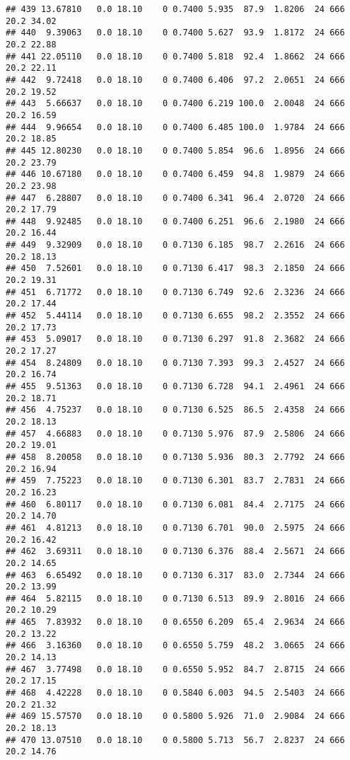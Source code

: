 \documentclass[
]{article}
\begin{document}
\begin{verbatim}
## 439 13.67810   0.0 18.10    0 0.7400 5.935  87.9  1.8206  24 666    20.2 34.02
## 440  9.39063   0.0 18.10    0 0.7400 5.627  93.9  1.8172  24 666    20.2 22.88
## 441 22.05110   0.0 18.10    0 0.7400 5.818  92.4  1.8662  24 666    20.2 22.11
## 442  9.72418   0.0 18.10    0 0.7400 6.406  97.2  2.0651  24 666    20.2 19.52
## 443  5.66637   0.0 18.10    0 0.7400 6.219 100.0  2.0048  24 666    20.2 16.59
## 444  9.96654   0.0 18.10    0 0.7400 6.485 100.0  1.9784  24 666    20.2 18.85
## 445 12.80230   0.0 18.10    0 0.7400 5.854  96.6  1.8956  24 666    20.2 23.79
## 446 10.67180   0.0 18.10    0 0.7400 6.459  94.8  1.9879  24 666    20.2 23.98
## 447  6.28807   0.0 18.10    0 0.7400 6.341  96.4  2.0720  24 666    20.2 17.79
## 448  9.92485   0.0 18.10    0 0.7400 6.251  96.6  2.1980  24 666    20.2 16.44
## 449  9.32909   0.0 18.10    0 0.7130 6.185  98.7  2.2616  24 666    20.2 18.13
## 450  7.52601   0.0 18.10    0 0.7130 6.417  98.3  2.1850  24 666    20.2 19.31
## 451  6.71772   0.0 18.10    0 0.7130 6.749  92.6  2.3236  24 666    20.2 17.44
## 452  5.44114   0.0 18.10    0 0.7130 6.655  98.2  2.3552  24 666    20.2 17.73
## 453  5.09017   0.0 18.10    0 0.7130 6.297  91.8  2.3682  24 666    20.2 17.27
## 454  8.24809   0.0 18.10    0 0.7130 7.393  99.3  2.4527  24 666    20.2 16.74
## 455  9.51363   0.0 18.10    0 0.7130 6.728  94.1  2.4961  24 666    20.2 18.71
## 456  4.75237   0.0 18.10    0 0.7130 6.525  86.5  2.4358  24 666    20.2 18.13
## 457  4.66883   0.0 18.10    0 0.7130 5.976  87.9  2.5806  24 666    20.2 19.01
## 458  8.20058   0.0 18.10    0 0.7130 5.936  80.3  2.7792  24 666    20.2 16.94
## 459  7.75223   0.0 18.10    0 0.7130 6.301  83.7  2.7831  24 666    20.2 16.23
## 460  6.80117   0.0 18.10    0 0.7130 6.081  84.4  2.7175  24 666    20.2 14.70
## 461  4.81213   0.0 18.10    0 0.7130 6.701  90.0  2.5975  24 666    20.2 16.42
## 462  3.69311   0.0 18.10    0 0.7130 6.376  88.4  2.5671  24 666    20.2 14.65
## 463  6.65492   0.0 18.10    0 0.7130 6.317  83.0  2.7344  24 666    20.2 13.99
## 464  5.82115   0.0 18.10    0 0.7130 6.513  89.9  2.8016  24 666    20.2 10.29
## 465  7.83932   0.0 18.10    0 0.6550 6.209  65.4  2.9634  24 666    20.2 13.22
## 466  3.16360   0.0 18.10    0 0.6550 5.759  48.2  3.0665  24 666    20.2 14.13
## 467  3.77498   0.0 18.10    0 0.6550 5.952  84.7  2.8715  24 666    20.2 17.15
## 468  4.42228   0.0 18.10    0 0.5840 6.003  94.5  2.5403  24 666    20.2 21.32
## 469 15.57570   0.0 18.10    0 0.5800 5.926  71.0  2.9084  24 666    20.2 18.13
## 470 13.07510   0.0 18.10    0 0.5800 5.713  56.7  2.8237  24 666    20.2 14.76

\end{verbatim}
\end{document}
